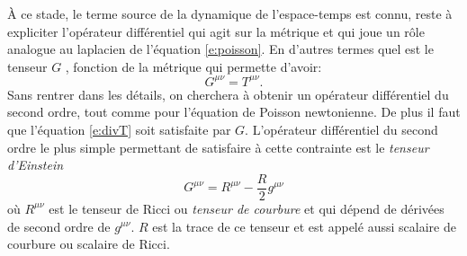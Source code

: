 À ce stade, le terme source de la dynamique de l'espace-temps est connu, reste à expliciter l'opérateur différentiel qui agit sur la métrique et qui joue un rôle analogue au laplacien de l'équation \ref{e:poisson}. En d'autres termes quel est le tenseur $G$ , fonction de la métrique qui permette d'avoir:
\begin{equation}
G^{\mu\nu}=T^{\mu\nu}.
\end{equation}
Sans rentrer dans les détails, on cherchera à obtenir un opérateur différentiel du second ordre, tout comme pour l'équation de Poisson newtonienne. De plus il faut que l'équation \ref{e:divT} soit satisfaite par $G$. L'opérateur différentiel du second ordre le plus simple permettant de satisfaire à cette contrainte est le \textit{tenseur d'Einstein}
\begin{equation}
G^{\mu\nu}=R^{\mu\nu}-\frac{R}{2}g^{\mu\nu}
\label{e:einstein}
\end{equation}
où $R^{\mu\nu}$ est le tenseur de Ricci ou \textit{tenseur de courbure} et qui dépend de dérivées de second ordre de $g^{\mu\nu}$. $R$ est la trace de ce tenseur et est appelé aussi scalaire de courbure ou scalaire de Ricci.

